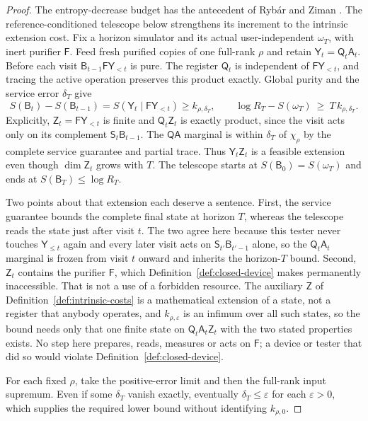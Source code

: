 \documentclass[11pt,a4paper]{article}
\numberwithin{equation}{section}
\theoremstyle{plain}
\theoremstyle{definition}
\newcommand{\rg}[1]{\mathsf{#1}}
\begin{document}
\begin{proof}
The entropy-decrease budget has the antecedent of Ryb\'ar and Ziman
\cite[section III, Eq.~(3.7)]{RybarZiman2008}. The reference-conditioned
telescope below strengthens its increment to the intrinsic extension cost.
Fix a horizon simulator and its actual user-independent $\omega_T$, with inert
purifier $\rg{F}$. Feed fresh purified copies of one full-rank $\rho$ and
retain $\rg{Y}_t=\rg{Q}_t\rg{A}_t$. Before each visit
$\rg{B}_{t-1}\rg{F}\rg{Y}_{<t}$ is pure. The register $\rg{Q}_t$ is
independent of $\rg{F}\rg{Y}_{<t}$, and tracing the active operation preserves
this product exactly. Global purity and the service error $\delta_T$ give
\begin{equation}
\label{eq:converse-budgets}
S(\rg{B}_t)-S(\rg{B}_{t-1})=S(\rg{Y}_t\mid \rg{F}\rg{Y}_{<t})
\ge k_{\rho,\delta_T},
\qquad
\log R_T-S(\omega_T)\ \ge\ T\,k_{\rho,\delta_T}.
\end{equation}
Explicitly, $\rg{Z}_t=\rg{F}\rg{Y}_{<t}$ is finite and
$\rg{Q}_t\rg{Z}_t$ is exactly product, since the visit acts only on its
complement $\rg{S}_t\rg{B}_{t-1}$. The $\rg{Q}\rg{A}$ marginal is within
$\delta_T$ of $\chi_\rho$ by the complete service guarantee and partial trace.
Thus $\rg{Y}_t\rg{Z}_t$ is a feasible extension even though $\dim\rg{Z}_t$
grows with $T$. The telescope starts at $S(\rg{B}_0)=S(\omega_T)$ and ends at
$S(\rg{B}_T)\le\log R_T$.

Two points about that extension each deserve a sentence. First, the service
guarantee bounds the complete final state at horizon $T$, whereas the
telescope reads the state just after visit $t$. The two agree here because
this tester never touches $\rg{Y}_{\le t}$ again and every later visit acts on
$\rg{S}_{t'}\rg{B}_{t'-1}$ alone, so the $\rg{Q}_t\rg{A}_t$ marginal is frozen
from visit $t$ onward and inherits the horizon-$T$ bound. Second,
$\rg{Z}_t$ contains the purifier $\rg{F}$, which
Definition~\ref{def:closed-device} makes permanently inaccessible. That is not
a use of a forbidden resource. The auxiliary $\rg{Z}$ of
Definition~\ref{def:intrinsic-costs} is a mathematical extension of a state,
not a register that anybody operates, and $k_{\rho,\varepsilon}$ is an infimum
over all such states, so the bound needs only that one finite state on
$\rg{Q}_t\rg{A}_t\rg{Z}_t$ with the two stated properties exists. No step here
prepares, reads, measures or acts on $\rg{F}$; a device or tester that did so
would violate Definition~\ref{def:closed-device}.

For each fixed $\rho$, take the positive-error limit and then the full-rank
input supremum. Even if some $\delta_T$ vanish exactly, eventually
$\delta_T\le\varepsilon$ for each $\varepsilon>0$, which supplies the required
lower bound without identifying $k_{\rho,0}$.


\end{proof}
\end{document}
